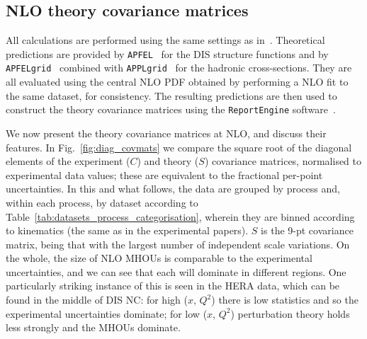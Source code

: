 \subsection{NLO theory covariance matrices}
All calculations are performed using 
the same settings as in~\cite{Ball:2017nwa}. Theoretical predictions are provided by {\tt APFEL}~\cite{Bertone:2013vaa} for the DIS structure functions
and by {\tt APFELgrid}~\cite{Bertone:2016lga} combined with
{\tt APPLgrid}~\cite{Carli:2010rw} for the hadronic
cross-sections. They are all evaluated using the central NLO PDF obtained by performing a NLO fit to the same dataset, for consistency. The resulting predictions are then used to construct the theory covariance matrices using the {\tt ReportEngine} software~\cite{zahari_kassabov_2019_2571601}.

We now present the theory covariance matrices at NLO, and discuss their features. In Fig.~\ref{fig:diag_covmats} we compare the square root of the diagonal elements of the experiment ($C$) and theory ($S$) covariance matrices, normalised to experimental data values; these are equivalent to the fractional per-point uncertainties. In this and what follows, the data are grouped by process and, within each process, by dataset according to Table~\ref{tab:datasets_process_categorisation}, wherein they are binned according to kinematics (the same as in the experimental papers). $S$ is the 9-pt covariance matrix, being that with the largest number of independent scale variations. On the whole, the size of NLO MHOUs is comparable to the experimental uncertainties, and we can see that each will dominate in different regions. One particularly striking instance of this is seen in the HERA data, which can be found in the middle of DIS NC: for high ($x$, $Q^2$) there is low statistics and so the experimental uncertainties dominate; for low ($x$, $Q^2$) perturbation theory holds less strongly and the MHOUs dominate. 

